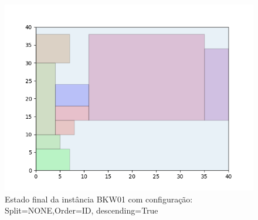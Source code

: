 \begin{figure}[H]
    \centering
    \caption[]{Estado final da instância BKW01 com configuração: Split=NONE,Order=ID, descending=True}
    \label{fig:bkw01-none-id-true}
    \includegraphics[scale=0.5]{output/figures/bkw/bkw01/none/id/true/00}
\end{figure}